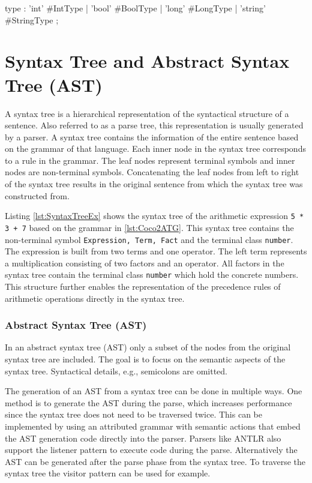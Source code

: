 \begin{AntlrCode}[float,numbers=none,caption=Example rule using alternative labels for the rule alternatives., label=lst:ANTLRRuleAlt]
  type
      : 'int'     #IntType
      | 'bool'    #BoolType
      | 'long'    #LongType
      | 'string'  #StringType
      ;
  \end{AntlrCode}

\section{Syntax Tree and Abstract Syntax Tree (AST)}

A syntax tree is a hierarchical representation of the syntactical structure of a sentence. Also referred to as a parse tree, this representation is usually generated by a parser. A syntax tree contains the information of the entire sentence based on the grammar of that language. Each inner node in the syntax tree corresponds to a rule in the grammar. The leaf nodes represent terminal symbols and inner nodes are non-terminal symbols. Concatenating the leaf nodes from left to right of the syntax tree results in the original sentence from which the syntax tree was constructed from. 

Listing \ref{lst:SyntaxTreeEx} shows the syntax tree of the arithmetic expression \texttt{5 * 3 + 7} based on the grammar in \ref{lst:Coco2ATG}. 
This syntax tree contains the non-terminal symbol \texttt{Expression, Term, Fact} and the terminal class \texttt{number}. The expression is built from two terms and one operator. The left term represents a multiplication consisting of two factors and an operator. All factors in the syntax tree contain the terminal class \texttt{number} which hold the concrete numbers. This structure further enables the representation of the precedence rules of arithmetic operations directly in the syntax tree.  

\subsubsection{Abstract Syntax Tree (AST)}
In an abstract syntax tree (AST) only a subset of the nodes from the original syntax tree are included. The goal is to focus on the semantic aspects of the syntax tree. Syntactical details, e.g., semicolons are omitted. 

The generation of an AST from a syntax tree can be done in multiple ways. One method is to generate the AST during the parse, which increases performance since the syntax tree does not need to be traversed twice. This can be implemented by using an attributed grammar with semantic actions that embed the AST generation code directly into the parser. Parsers like ANTLR also support the listener pattern to execute code during the parse. Alternatively the AST can be generated after the parse phase from the syntax tree. To traverse the syntax tree the visitor pattern can be used for example.  

